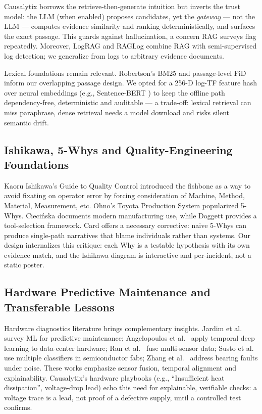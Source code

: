 \documentclass[12pt,a4paper,oneside]{report}
\begin{document}
Causalytix borrows the retrieve-then-generate intuition but inverts the trust model: the LLM (when enabled) proposes candidates, yet the \textit{gateway} --- not the LLM --- computes evidence similarity and ranking deterministically, and surfaces the exact passage. This guards against hallucination, a concern RAG surveys \cite{gao2023retrieval} flag repeatedly. Moreover, LogRAG \cite{zhang2024lograg} and RAGLog \cite{pan2024raglog} combine RAG with semi-supervised log detection; we generalize from logs to arbitrary evidence documents.

Lexical foundations remain relevant. Robertson's BM25 \cite{robertson2009probabilistic} and passage-level FiD \cite{izacard2021leveraging} inform our overlapping passage design. We opted for a 256-D log-TF feature hash over neural embeddings (e.g., Sentence-BERT \cite{reimers2019sentencebert}) to keep the offline path dependency-free, deterministic and auditable --- a trade-off: lexical retrieval can miss paraphrase, dense retrieval needs a model download and risks silent semantic drift.

\subsection{Ishikawa, 5-Whys and Quality-Engineering Foundations}
Kaoru Ishikawa's Guide to Quality Control \cite{ishikawa1986guide} introduced the fishbone as a way to avoid fixating on operator error by forcing consideration of Machine, Method, Material, Measurement, etc. Ohno's Toyota Production System \cite{ohno1988toyota} popularized 5-Whys. Cieci{\'n}ska \cite{ciecinska2023identification} documents modern manufacturing use, while Doggett \cite{doggett2005root} provides a tool-selection framework. Card \cite{card2017problem} offers a necessary corrective: naive 5-Whys can produce single-path narratives that blame individuals rather than systems. Our design internalizes this critique: each Why is a testable hypothesis with its own evidence match, and the Ishikawa diagram is interactive and per-incident, not a static poster.

\subsection{Hardware Predictive Maintenance and Transferable Lessons}
Hardware diagnostics literature brings complementary insights. Jardim et al.\ \cite{jardim2019predictive} survey ML for predictive maintenance; Angelopoulos et al.\ \cite{angelopoulos2022hardware} apply temporal deep learning to data-center hardware; Ran et al.\ \cite{ran2021robust} fuse multi-sensor data; Susto et al.\ \cite{susto2015machine} use multiple classifiers in semiconductor fabs; Zhang et al.\ \cite{zhang2022intelligent} address bearing faults under noise. These works emphasize sensor fusion, temporal alignment and explainability. Causalytix's hardware playbooks (e.g., ``Insufficient heat dissipation'', voltage-drop lead) echo this need for explainable, verifiable checks: a voltage trace is a lead, not proof of a defective supply, until a controlled test confirms.
\end{document}
